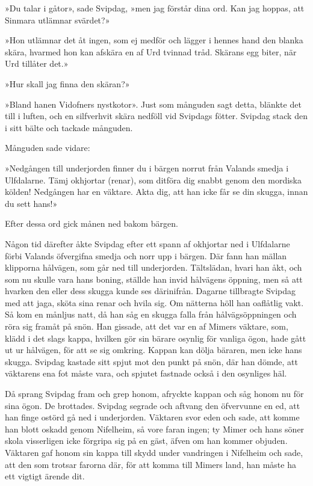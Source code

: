 »Du talar i gåtor», sade Svipdag, »men jag förstår dina ord. Kan jag
hoppas, att Sinmara utlämnar svärdet?»

»Hon utlämnar det åt ingen, som ej medför och lägger i hennes hand den
blanka skära, hvarmed hon kan afskära
en af Urd tvinnad tråd. Skärans egg biter, när Urd tillåter det.»

»Hur skall jag finna den skäran?»

»Bland hanen Vidofners
nystkotor». Just som
månguden sagt detta, blänkte det till i luften, och en silfverhvit skära
nedföll vid Svipdags fötter. Svipdag stack den i sitt bälte och tackade
månguden.

Månguden sade vidare:

»Nedgången till underjorden finner du i bärgen norrut från Valands
smedja i Ulfdalarne. Tämj okhjortar (renar), som ditföra dig snabbt
genom den mordiska kölden! Nedgången har en väktare. Akta dig, att han
icke får se din skugga, innan du sett hans!»

Efter dessa ord gick månen ned bakom bärgen.

\sectionbreak

Någon tid därefter åkte Svipdag efter ett spann af okhjortar ned i
Ulfdalarne förbi Valands öfvergifna smedja och norr upp i bärgen. Där
fann han mällan klipporna hålvägen, som går ned till underjorden.
Tältslädan, hvari han åkt, och som nu skulle vara hans boning, ställde
han invid hålvägens öppning, men så att hvarken den eller dess skugga
kunde ses därinifrån. Dagarne tillbragte Svipdag med att jaga, sköta
sina renar och hvila sig. Om nätterna höll han oaflåtlig vakt. Så kom en
månljus natt, då han såg en skugga falla från hålvägsöppningen och röra
sig framåt på snön. Han gissade, att det var en af Mimers väktare, som,
klädd i det slags kappa, hvilken gör sin bärare osynlig för vanliga
ögon, hade gått ut ur hålvägen, för att se sig omkring. Kappan kan dölja
bäraren, men icke hans skugga. Svipdag kastade sitt spjut mot den punkt
på snön, där han dömde, att väktarens ena fot måste vara, och spjutet
fastnade också i den osynliges häl.

Då sprang Svipdag fram och grep honom, afryckte kappan och såg honom nu
för sina ögon. De brottades. Svipdag segrade och aftvang den öfvervunne
en ed, att han finge ostörd gå ned i underjorden. Väktaren svor eden och
sade, att komme han blott oskadd genom Nifelheim, så vore faran ingen;
ty Mimer och hans söner skola visserligen icke förgripa sig på en gäst,
äfven om han kommer objuden. Väktaren gaf honom sin kappa till skydd
under vandringen i Nifelheim och sade, att den som trotsar farorna där,
för att komma till Mimers land, han måste ha ett vigtigt ärende dit.

